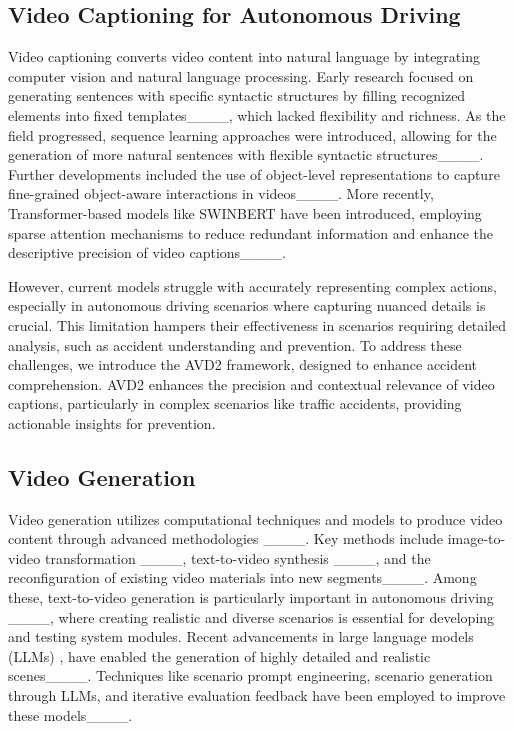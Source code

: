 \subsection{Video Captioning for Autonomous Driving}

Video captioning converts video content into natural language by integrating computer vision and natural language processing. Early research focused on generating sentences with specific syntactic structures by filling recognized elements into fixed templates____, which lacked flexibility and richness. As the field progressed, sequence learning approaches were introduced, allowing for the generation of more natural sentences with flexible syntactic structures____. Further developments included the use of object-level representations to capture fine-grained object-aware interactions in videos____. More recently, Transformer-based models like SWINBERT have been introduced, employing sparse attention mechanisms to reduce redundant information and enhance the descriptive precision of video captions____.

However, current models struggle with accurately representing complex actions, especially in autonomous driving scenarios where capturing nuanced details is crucial. This limitation hampers their effectiveness in scenarios requiring detailed analysis, such as accident understanding and prevention. To address these challenges, we introduce the AVD2 framework, designed to enhance accident comprehension. AVD2 enhances the precision and contextual relevance of video captions, particularly in complex scenarios like traffic accidents, providing actionable insights for prevention.

\subsection{Video Generation}

Video generation utilizes computational techniques and models to produce video content through advanced methodologies ____. Key methods include image-to-video transformation ____, text-to-video synthesis ____, and the reconfiguration of existing video materials into new segments____. Among these, text-to-video generation is particularly important in autonomous driving ____, where creating realistic and diverse scenarios is essential for developing and testing system modules. Recent advancements in large language models (LLMs)
, have enabled the generation of highly detailed and realistic scenes____.
 Techniques like scenario prompt engineering, scenario generation through LLMs, and iterative evaluation feedback have been employed to improve these models____.

